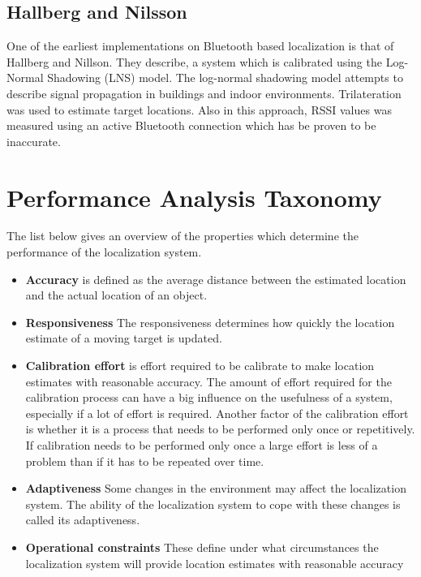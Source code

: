 \documentclass[12pt]{article}
\begin{document}
\subsection{Hallberg and Nilsson}
One of the earliest implementations on Bluetooth based localization is that of Hallberg and Nillson. \cite{hallberg-nilsson} They describe, a system which is calibrated using the Log-Normal Shadowing (LNS) model. The log-normal shadowing model attempts to describe signal propagation in buildings and indoor environments. Trilateration was used to estimate target locations. Also in this approach, RSSI values was measured using an active Bluetooth connection which has be proven to be inaccurate. 




\section{Performance Analysis Taxonomy}
The list below gives an overview of the properties which determine the performance of the localization system.

\begin{itemize}
  \item \textbf{Accuracy} is defined as the average distance between the estimated location and the actual location of an object.
  \item \textbf{Responsiveness} The responsiveness determines how quickly the location estimate of a moving target is updated.
  \item \textbf{Calibration effort} is effort required to be calibrate to make location estimates with reasonable accuracy. The amount of effort required for the calibration process can have a big influence on the usefulness of a system, especially if a lot of effort is required. Another factor of the calibration effort is whether it is a process that needs to be performed only once or repetitively. If calibration needs to be performed only once a large effort is less of a problem than if it has to be repeated over time.
  \item \textbf{Adaptiveness} Some changes in the environment may affect the localization system. The ability of the localization system to cope with these changes is called its adaptiveness. 
  \item \textbf{Operational constraints} These define under what circumstances the localization system will provide location estimates with reasonable accuracy
\end{itemize}
\end{document}
